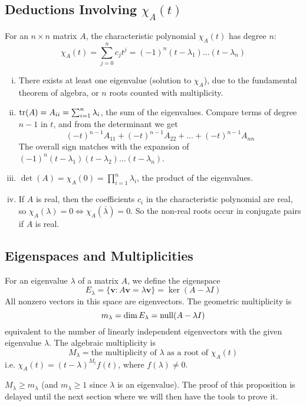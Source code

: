 \documentclass{article}
\begin{document}
	\subsection{Deductions Involving $\chi_A(t)$}
	For an $n \times n$ matrix $A$, the characteristic polynomial $\chi_A(t)$ has degree $n$:
	\[ \chi_A(t) = \sum_{j = 0}^n c_j t^j = (-1)^n(t-\lambda_1)\dots(t-\lambda_n) \]
	\begin{enumerate}[(i)]
		\item There exists at least one eigenvalue (solution to $\chi_A$), due to the fundamental theorem of algebra, or $n$ roots counted with multiplicity.
		\item $\tr(A) = A_{ii} = \sum_{i=1}^n \lambda_i$, the sum of the eigenvalues. Compare terms of degree $n-1$ in $t$, and from the determinant we get
		\[ (-t)^{n-1}A_{11} + (-t)^{n-1}A_{22} + \dots + (-t)^{n-1}A_{nn} \]
		The overall sign matches with the expansion of $(-1)^n(t-\lambda_1)(t-\lambda_2)\dots(t-\lambda_n)$.
		\item $\det(A) = \chi_A(0) = \prod_{i=1}^n \lambda_i$, the product of the eigenvalues.
		\item If $A$ is real, then the coefficients $c_i$ in the characteristic polynomial are real, so $\chi_A(\lambda) = 0 \iff \chi_A(\overline\lambda) = 0$. So the non-real roots occur in conjugate pairs if $A$ is real.
	\end{enumerate}

	\subsection{Eigenspaces and Multiplicities}
	For an eigenvalue $\lambda$ of a matrix $A$, we define the eigenspace
	\[ E_\lambda = \{ \bm v : A \bm v = \lambda \bm v \} = \ker (A - \lambda I) \]
	All nonzero vectors in this space are eigenvectors. The geometric multiplicity is
	\[ m_\lambda = \dim E_\lambda = \operatorname{null} (A - \lambda I) \]
	equivalent to the number of linearly independent eigenvectors with the given eigenvalue $\lambda$. The algebraic multiplicity is
	\[ M_\lambda = \text{the multiplicity of } \lambda \text{ as a root of } \chi_A(t) \]
	i.e. $\chi_A(t) = (t - \lambda)^{M_t} f(t)$, where $f(\lambda) \neq 0$.

	\begin{proposition}
		$M_\lambda \geq m_\lambda$ (and $m_\lambda \geq 1$ since $\lambda$ is an eigenvalue). The proof of this proposition is delayed until the next section where we will then have the tools to prove it.
	\end{proposition}
\end{document}
